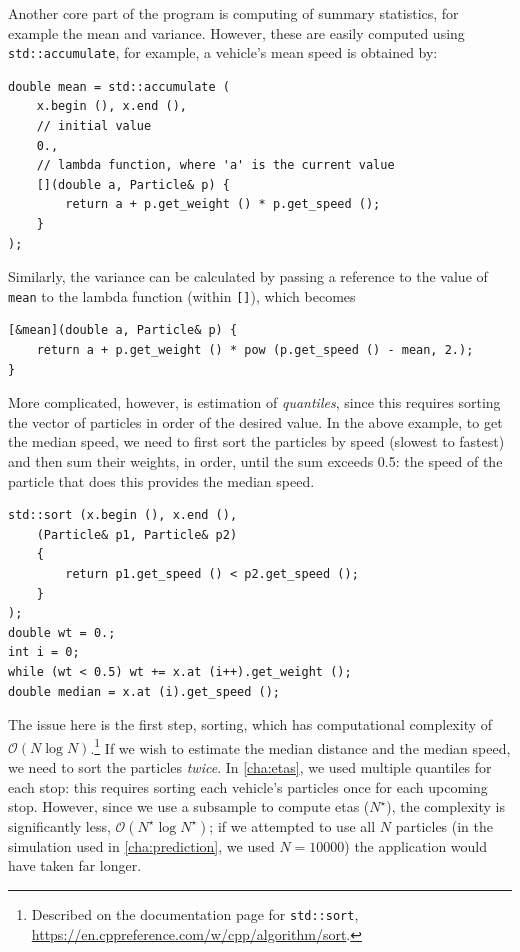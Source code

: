 Another core part of the program is computing of summary statistics, for example the mean and variance. However, these are easily computed using \verb+std::accumulate+, for example, a vehicle's mean speed is obtained by:
\begin{lstlisting}
double mean = std::accumulate (
    x.begin (), x.end (),
    // initial value
    0.,
    // lambda function, where 'a' is the current value
    [](double a, Particle& p) {
        return a + p.get_weight () * p.get_speed ();
    }
);
\end{lstlisting}
Similarly, the variance can be calculated by passing a reference to the value of {\tt mean} to the lambda function (within {\tt []}), which becomes
\begin{lstlisting}
[&mean](double a, Particle& p) {
    return a + p.get_weight () * pow (p.get_speed () - mean, 2.);
}
\end{lstlisting}

More complicated, however, is estimation of \emph{quantiles}, since this requires sorting the vector of particles in order of the desired value. In the above example, to get the median speed, we need to first sort the particles by speed (slowest to fastest) and then sum their weights, in order, until the sum exceeds 0.5: the speed of the particle that does this provides the median speed.
\begin{lstlisting}
std::sort (x.begin (), x.end (),
    (Particle& p1, Particle& p2)
    {
        return p1.get_speed () < p2.get_speed ();
    }
);
double wt = 0.;
int i = 0;
while (wt < 0.5) wt += x.at (i++).get_weight ();
double median = x.at (i).get_speed ();
\end{lstlisting}

The issue here is the first step, sorting, which has computational complexity of $\mathcal{O}(N\log N)$.\footnote{Described on the documentation page for \texttt{std::sort}, \url{https://en.cppreference.com/w/cpp/algorithm/sort}.} If we wish to estimate the median distance and the median speed, we need to sort the particles \emph{twice}. In \cref{cha:etas}, we used multiple quantiles for each stop: this requires sorting each vehicle's particles once for each upcoming stop. However, since we use a subsample to compute \glspl{eta} ($N^\star$), the complexity is significantly less, $\mathcal{O}(N^\star\log N^\star)$; if we attempted to use all $N$ particles (in the simulation used in \cref{cha:prediction}, we used $N=10000$) the application would have taken far longer.



